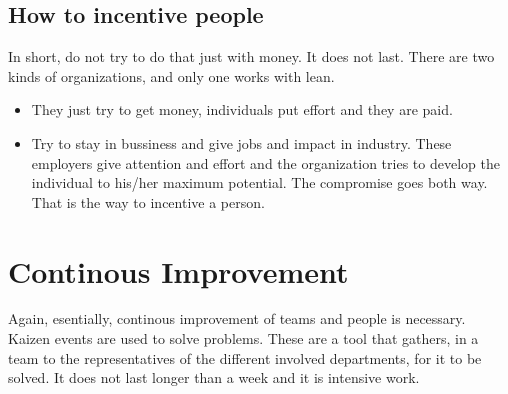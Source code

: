 \documentclass[a4paper,12pt]{article}
\begin{document}
\subsection{How to incentive people}

In short, do not try to do that just with money. It does not last. There are two kinds of organizations, and only one works with lean.

\begin{itemize}
\item They just try to get money, individuals put effort and they are paid.
\item Try to stay in bussiness and give jobs and impact in industry. These employers give attention and effort and the organization tries to develop the individual to his/her maximum potential. The compromise goes both way. That is the way to incentive a person.
\end{itemize}

\section{ Continous Improvement}

Again, esentially, continous improvement of teams and people is necessary. Kaizen events are used to solve problems. These are a tool that gathers, in a team to the representatives of the different involved departments, for it to be solved. It does not last longer than a week and it is intensive work. 
\end{document}
